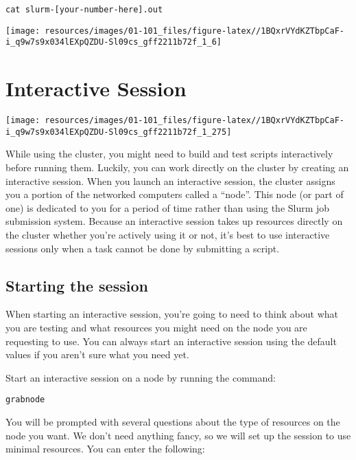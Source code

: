 \documentclass[
]{book}
\begin{document}
\begin{verbatim}
cat slurm-[your-number-here].out
\end{verbatim}

\texttt{[image: resources/images/01-101\_files/figure-latex//1BQxrVYdKZTbpCaF-i\_q9w7s9x034lEXpQZDU-Sl09cs\_gff2211b72f\_1\_6]}

\hypertarget{interactive-session}{%
\chapter{Interactive Session}\label{interactive-session}}

\texttt{[image: resources/images/01-101\_files/figure-latex//1BQxrVYdKZTbpCaF-i\_q9w7s9x034lEXpQZDU-Sl09cs\_gff2211b72f\_1\_275]}

While using the cluster, you might need to build and test scripts interactively before running them. Luckily, you can work directly on the cluster by creating an interactive session. When you launch an interactive session, the cluster assigns you a portion of the networked computers called a ``node''. This node (or part of one) is dedicated to you for a period of time rather than using the Slurm job submission system. Because an interactive session takes up resources directly on the cluster whether you're actively using it or not, it's best to use interactive sessions only when a task cannot be done by submitting a script.

\hypertarget{starting-the-session}{%
\section{Starting the session}\label{starting-the-session}}

When starting an interactive session, you're going to need to think about what you are testing and what resources you might need on the node you are requesting to use. You can always start an interactive session using the default values if you aren't sure what you need yet.

Start an interactive session on a node by running the command:

\begin{verbatim}
grabnode
\end{verbatim}

You will be prompted with several questions about the type of resources on the node you want. We don't need anything fancy, so we will set up the session to use minimal resources. You can enter the following:
\end{document}
